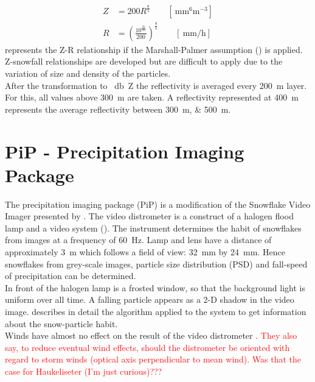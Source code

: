 \begin{align}
Z & = 200 R^{\frac{8}{5}} \qquad [\SI{}{\mm^6\metre^{-3}} ] \nonumber \\ 
R & = \left( \frac{ 10^{\frac{Ze}{10}} }{200} \right)^{\frac{8}{5}} \qquad [ \SI{}{\mm\per\hour} ]
\label{eq:Z-R}
\end{align}
 represents the Z-R relationship if the Marshall-Palmer assumption () is applied. Z-snowfall relationships are developed but are difficult to apply due to the variation of size and density of the particles. \\
After the transformation to \SI{}{\decibel Z} the reflectivity is averaged every \SI{200}{\metre} layer. For this, all values above \SI{300}{\metre} are taken. A reflectivity represented at \SI{400}{\metre} represents the average reflectivity between \SIlist{300;500}{\metre}. 

\section{PiP - Precipitation Imaging Package}

The precipitation imaging package (PiP) is a modification of the Snowflake Video Imager presented by \cite{newman_presenting_2009}. The video distrometer is a construct of a halogen flood lamp and a video system (). The instrument determines the habit of snowflakes from images at a frequency of \SI{60}{\Hz}. Lamp and lens have a distance of approximately \SI{3}{\metre} which follows a field of view: \SI{32}{\mm} by \SI{24}{\mm}. Hence snowflakes from grey-scale images, particle size distribution (PSD) and fall-speed of precipitation can be determined. 
\\
In front of the halogen lamp is a frosted window, so that the background light is uniform over all time. A falling particle appears as a 2-D shadow in the video image. \cite{newman_presenting_2009} describes in detail the algorithm applied to the system to get information about the snow-particle habit. \\
Winds have almost no effect on the result of the video distrometer \citep{newman_presenting_2009}. \textcolor{red}{They also say, to reduce eventual wind effects, should the distrometer be oriented with regard to storm winds (optical axis perpendicular to mean wind). Was that the case for Haukeliseter (I'm just curious)???}

